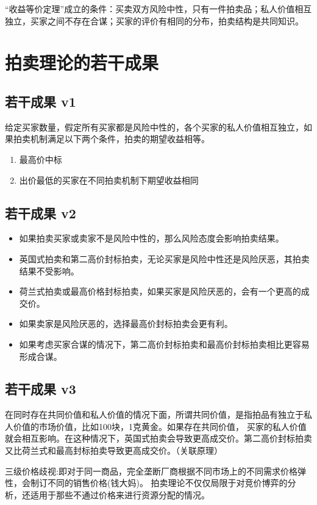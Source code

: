 \documentclass[12pt, a4paper]{article} %
\begin{document}
\begin{CJK*}{UTF8}{gbsn}
        “收益等价定理”成立的条件：买卖双方风险中性，只有一件拍卖品；私人价值相互独立，买家之间不存在合谋；买家的评价有相同的分布，拍卖结构是共同知识。

        \clearpage
        \section{拍卖理论的若干成果}
        \subsection{若干成果 v1}
        给定买家数量，假定所有买家都是风险中性的，各个买家的私人价值相互独立，如果拍卖机制满足以下两个条件，拍卖的期望收益相等。
        \begin{enumerate}
            \item 最高价中标
            \item 出价最低的买家在不同拍卖机制下期望收益相同
        \end{enumerate}
        \subsection{若干成果 v2}
        \begin{itemize}
            \item 如果拍卖买家或卖家不是风险中性的，那么风险态度会影响拍卖结果。
            \item 英国式拍卖和第二高价封标拍卖，无论买家是风险中性还是风险厌恶，其拍卖结果不受影响。
            \item 荷兰式拍卖或最高价格封标拍卖，如果买家是风险厌恶的，会有一个更高的成交价。
            \item 如果卖家是风险厌恶的，选择最高价封标拍卖会更有利。
            \item 如果考虑买家合谋的情况下，第二高价封标拍卖和最高价封标拍卖相比更容易形成合谋。
        \end{itemize}
        \subsection{若干成果 v3}
        在同时存在共同价值和私人价值的情况下面，所谓共同价值，是指拍品有独立于私人价值的市场价值，比如100块，1克黄金。如果存在共同价值，
        买家的私人价值就会相互影响。在这种情况下，英国式拍卖会导致更高成交价。第二高价封标拍卖又比荷兰式和最高封标拍卖导致更高成交价。（关联原理）\par

        三级价格歧视:即对于同一商品，完全垄断厂商根据不同市场上的不同需求价格弹性，会制订不同的销售价格(钱大妈)。
        拍卖理论不仅仅局限于对竞价博弈的分析，还适用于那些不通过价格来进行资源分配的情况。


\end{CJK*}
\end{document}
